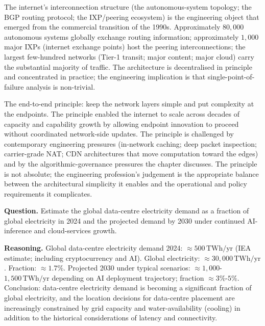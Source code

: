 The internet's interconnection structure (the autonomous-system topology; the BGP routing protocol; the IXP/peering ecosystem) is the engineering object that emerged from the commercial transition of the 1990s. Approximately $80{,}000$ autonomous systems globally exchange routing information; approximately $1{,}000$ major IXPs (internet exchange points) host the peering interconnections; the largest few-hundred networks (Tier-1 transit; major content; major cloud) carry the substantial majority of traffic. The architecture is decentralised in principle and concentrated in practice; the engineering implication is that single-point-of-failure analysis is non-trivial.

\begin{principle}
The end-to-end principle: keep the network layers simple and put complexity at the endpoints. The principle enabled the internet to scale across decades of capacity and capability growth by allowing endpoint innovation to proceed without coordinated network-side updates. The principle is challenged by contemporary engineering pressures (in-network caching; deep packet inspection; carrier-grade NAT; CDN architectures that move computation toward the edges) and by the algorithmic-governance pressures the chapter discusses. The principle is not absolute; the engineering profession's judgement is the appropriate balance between the architectural simplicity it enables and the operational and policy requirements it complicates.
\end{principle}

\begin{estimation}
\textbf{Question.} Estimate the global data-centre electricity demand as a fraction of global electricity in 2024 and the projected demand by 2030 under continued AI-inference and cloud-services growth.

\textbf{Reasoning.} Global data-centre electricity demand 2024: $\approx 500\,\text{TWh/yr}$ (IEA estimate; including cryptocurrency and AI). Global electricity: $\approx 30{,}000\,\text{TWh/yr}$. Fraction: $\approx 1.7\%$. Projected 2030 under typical scenarios: $\approx 1{,}000$-$1{,}500\,\text{TWh/yr}$ depending on AI deployment trajectory; fraction $\approx 3\%$-$5\%$. Conclusion: data-centre electricity demand is becoming a significant fraction of global electricity, and the location decisions for data-centre placement are increasingly constrained by grid capacity and water-availability (cooling) in addition to the historical considerations of latency and connectivity.
\end{estimation}

